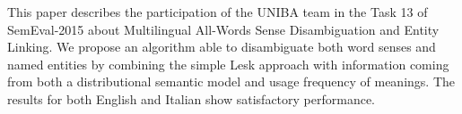 This paper describes the participation of the UNIBA team in the Task 13 of SemEval-2015 about Multilingual All-Words Sense Disambiguation and Entity Linking. We propose an algorithm able to disambiguate both word senses and named entities by combining the simple Lesk approach with information coming from both a distributional semantic model and usage frequency of meanings. The results for both English and Italian show satisfactory performance.
